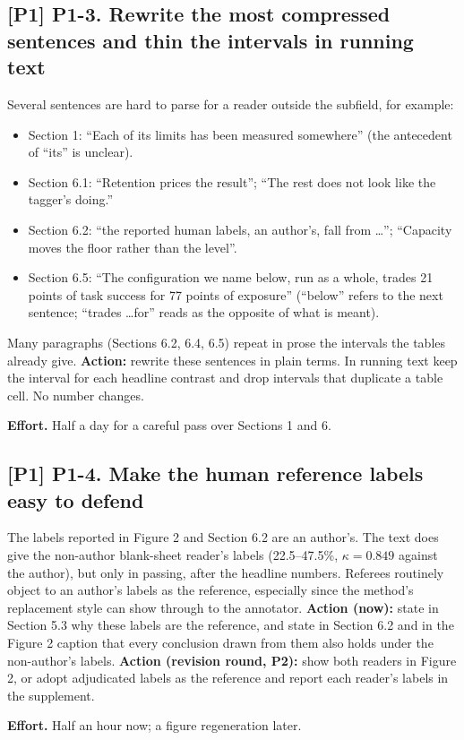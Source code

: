 \documentclass[10pt]{article}
\newcommand{\po}{\textbf{[P1]}}
\newcommand{\effort}[1]{\par\noindent\textbf{Effort.} #1}
\begin{document}
\subsection*{\po{} P1-3. Rewrite the most compressed sentences and thin the intervals in running text}
Several sentences are hard to parse for a reader outside the subfield, for example:
\begin{itemize}
\item Section 1: ``Each of its limits has been measured somewhere'' (the antecedent of ``its'' is unclear).
\item Section 6.1: ``Retention prices the result''; ``The rest does not look like the tagger's doing.''
\item Section 6.2: ``the reported human labels, an author's, fall from \ldots''; ``Capacity moves the floor rather
than the level''.
\item Section 6.5: ``The configuration we name below, run as a whole, trades 21 points of task success for 77 points
of exposure'' (``below'' refers to the next sentence; ``trades \ldots for'' reads as the opposite of what is meant).
\end{itemize}
Many paragraphs (Sections 6.2, 6.4, 6.5) repeat in prose the intervals the tables already give.
\textbf{Action:} rewrite these sentences in plain terms. In running text keep the interval for each headline
contrast and drop intervals that duplicate a table cell. No number changes.
\effort{Half a day for a careful pass over Sections 1 and 6.}

\subsection*{\po{} P1-4. Make the human reference labels easy to defend}
The labels reported in Figure 2 and Section 6.2 are an author's. The text does give the non-author blank-sheet
reader's labels (22.5--47.5\%, $\kappa=0.849$ against the author), but only in passing, after the headline numbers.
Referees routinely object to an author's labels as the reference, especially since the method's replacement style can
show through to the annotator.
\textbf{Action (now):} state in Section 5.3 why these labels are the reference, and state in Section 6.2 and in the
Figure 2 caption that every conclusion drawn from them also holds under the non-author's labels.
\textbf{Action (revision round, P2):} show both readers in Figure 2, or adopt adjudicated labels as the reference
and report each reader's labels in the supplement.
\effort{Half an hour now; a figure regeneration later.}
\end{document}
